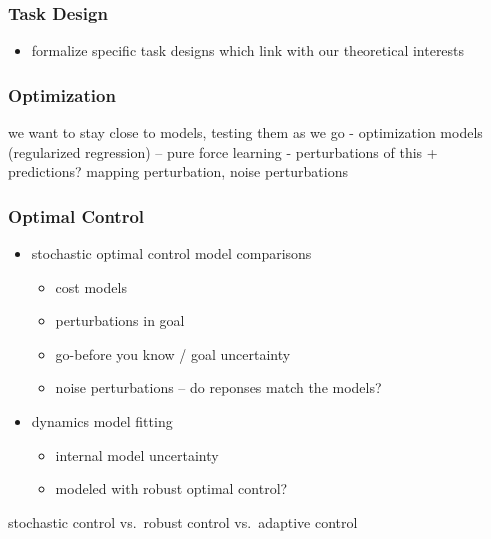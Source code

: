 \documentclass[
  a4paper,
]{article}
\providecommand{\tightlist}{%
  \setlength{\itemsep}{0pt}\setlength{\parskip}{0pt}}
\begin{document}
\hypertarget{task-design}{%
\subsubsection{Task Design}\label{task-design}}

\begin{itemize}
\tightlist
\item
  formalize specific task designs which link with our theoretical
  interests
\end{itemize}

\hypertarget{optimization}{%
\subsubsection{Optimization}\label{optimization}}

we want to stay close to models, testing them as we go - optimization
models (regularized regression) -- pure force learning - perturbations
of this + predictions? mapping perturbation, noise perturbations

\hypertarget{optimal-control}{%
\subsubsection{Optimal Control}\label{optimal-control}}

\begin{itemize}
\tightlist
\item
  stochastic optimal control model comparisons

  \begin{itemize}
  \tightlist
  \item
    cost models
  \item
    perturbations in goal
  \item
    go-before you know / goal uncertainty
  \item
    noise perturbations -- do reponses match the models?
  \end{itemize}
\item
  dynamics model fitting

  \begin{itemize}
  \tightlist
  \item
    internal model uncertainty
  \item
    modeled with robust optimal control?
  \end{itemize}
\end{itemize}

stochastic control vs.~robust control vs.~adaptive control
\end{document}
